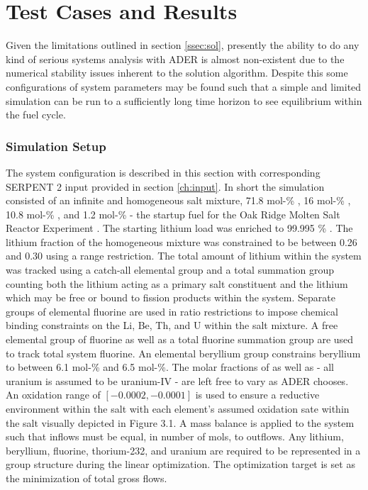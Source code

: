 \chapter{Test Cases and Results}
\label{ch:results}

Given the limitations outlined in section \ref{ssec:sol}, presently the ability
to do any kind of serious systems analysis with ADER is almost non-existent due
to the numerical stability issues inherent to the solution algorithm. Despite
this some configurations of system parameters may be found such that a simple
and limited simulation can be run to a sufficiently long time horizon to see
equilibrium within the fuel cycle.

\subsection{Simulation Setup}\label{ssec:setup}
The system configuration is described in this section with corresponding 
SERPENT 2
input provided in section \ref{ch:input}. In short the simulation consisted
of an infinite and homogeneous salt mixture, 71.8 mol-\% , 16 mol-\%
, 10.8 mol-\% , and 1.2 mol-\%  - the startup
fuel for the Oak Ridge Molten Salt Reactor Experiment \cite{ORNL}. The starting
lithium load was enriched to 99.995 \% . The lithium
fraction of the homogeneous mixture was constrained to be between 0.26 and 0.30
using a range restriction. The total amount of lithium within the system was
tracked using a catch-all elemental group and a total summation group counting
both the lithium acting as a primary salt constituent and the lithium which may
be free or bound to fission products within the system. Separate groups of
elemental fluorine are used in ratio restrictions to impose chemical binding 
constraints on the Li, Be, Th, and U within the salt mixture. A free elemental
group of fluorine as well as a total fluorine summation group are used to track
total system fluorine. An elemental beryllium group constrains beryllium to
between 6.1 mol-\% and 6.5 mol-\%. The molar fractions of  as well
as  - all uranium is assumed to be uranium-IV - are left free to vary
as ADER chooses. An oxidation range of $[-0.0002, -0.0001]$ is used to ensure
a reductive environment within the salt with each element's assumed oxidation
sate within the salt visually depicted in Figure 3.1. 
A mass balance is applied to the
system such that inflows must be equal, in number of mols, to outflows. Any
lithium, beryllium, fluorine, thorium-232, and uranium are required to be
represented in a group structure during the linear optimization. The
optimization target is set as the minimization of total gross flows.


